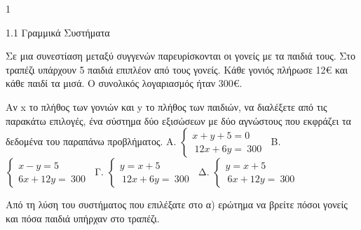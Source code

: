 \begin{ylh}{1}
\item 1.1 Γραμμικά Συστήματα
\end{ylh}
Σε μια συνεστίαση μεταξύ συγγενών παρευρίσκονται οι γονείς με τα παιδιά τους. Στο τραπέζι υπάρχουν 5 παιδιά επιπλέον από τους γονείς. Κάθε γονιός πλήρωσε 12€ και κάθε παιδί τα μισά. Ο συνολικός λογαριασμός ήταν 300€.
\begin{alist}
\item Αν x το πλήθος των γονιών και y το πλήθος των παιδιών, να διαλέξετε από τις παρακάτω επιλογές, ένα σύστημα δύο εξισώσεων με δύο αγνώστους που εκφράζει τα δεδομένα του παραπάνω προβλήματος.
Α. \(\left\{ \begin{array}{r}
x + y + 5 = 0\ \  \\
\ 12x + 6y = \ 300
\end{array} \right.\ \) Β. \(\left\{ \begin{array}{r}
x - y = 5\ \  \\
6x + 12y = \ 300
\end{array} \right.\ \)
Γ. \(\left\{ \begin{array}{r}
y = x + 5\ \  \\
\ 12x + 6y = \ 300
\end{array} \right.\ \) Δ. \(\left\{ \begin{array}{r}
y = x + 5\ \  \\
\ 6x + 12y = \ 300
\end{array} \right.\ \)
\item Από τη λύση του συστήματος που επιλέξατε στο α) ερώτημα να βρείτε πόσοι γονείς και πόσα παιδιά υπήρχαν στο τραπέζι.
\end{alist}

